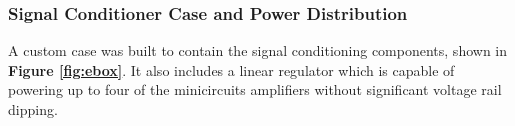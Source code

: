     \subsubsection{Signal Conditioner Case and Power Distribution}

A custom case was built to contain the signal conditioning components, shown in \textbf{Figure \ref{fig:ebox}}.  It also includes a linear regulator which is capable of powering up to four of the minicircuits amplifiers without significant voltage rail dipping.

\vfill

